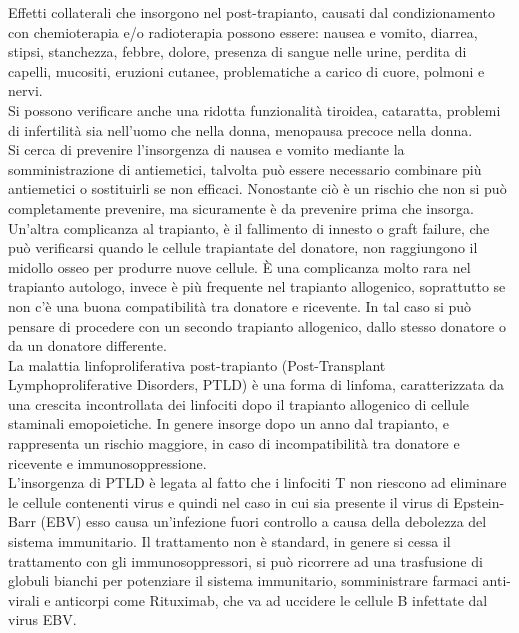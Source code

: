 Effetti collaterali che insorgono nel post-trapianto, causati dal condizionamento con chemioterapia e/o radioterapia 
possono essere: nausea e vomito, diarrea, stipsi, stanchezza, febbre, dolore, presenza di sangue nelle urine, 
perdita di capelli, mucositi, eruzioni cutanee, problematiche a carico di cuore, polmoni e nervi\cite{LLSBLOOD}.\\
Si possono verificare anche una ridotta funzionalità tiroidea, cataratta, problemi di infertilità sia nell’uomo 
che nella donna, menopausa precoce nella donna.\\
Si cerca di prevenire l’insorgenza di nausea e vomito mediante la somministrazione di antiemetici, talvolta 
può essere necessario combinare più antiemetici o sostituirli se non efficaci. 
Nonostante ciò è un rischio che non si può completamente prevenire, ma sicuramente è da prevenire prima che insorga\cite{STEMCELLS}.\\

Un’altra complicanza al trapianto, è il fallimento di innesto o graft failure, che può verificarsi quando le cellule 
trapiantate del donatore, non raggiungono il midollo osseo per produrre nuove cellule. È una complicanza molto rara 
nel trapianto autologo, invece è più frequente nel trapianto allogenico, soprattutto se non c’è una buona 
compatibilità tra donatore e ricevente. In tal caso si può pensare di procedere con un secondo trapianto allogenico, 
dallo stesso donatore o da un donatore differente\cite{LLSBLOOD}.\\

La malattia linfoproliferativa post-trapianto (Post-Transplant Lymphoproliferative Disorders, PTLD) è una forma di 
linfoma, caratterizzata da una crescita incontrollata dei linfociti dopo il trapianto allogenico di cellule staminali 
emopoietiche. In genere insorge dopo un anno dal trapianto, e rappresenta un rischio maggiore, in caso di incompatibilità 
tra donatore e ricevente e immunosoppressione.\\
L’insorgenza di PTLD è legata al fatto che i linfociti T non riescono ad eliminare le cellule contenenti 
virus e quindi nel caso in cui sia presente il virus di Epstein-Barr (EBV) esso causa un’infezione fuori controllo 
a causa della debolezza del sistema immunitario. Il trattamento non è standard, in genere si cessa il trattamento 
con gli immunosoppressori, si può ricorrere ad una trasfusione di globuli bianchi per potenziare il sistema 
immunitario, somministrare farmaci anti-virali e anticorpi come Rituximab, che va ad uccidere le cellule B infettate 
dal virus EBV\cite{STEMCELLS}.

